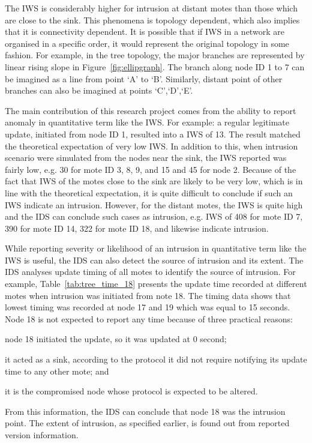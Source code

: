 \documentclass[conference,final]{IEEEtran}
\begin{document}
The IWS is considerably higher for intrusion at distant motes than those which are close to the sink.
This phenomena is topology dependent, which also implies  that it is connectivity dependent.
It is possible that if IWS in a network are organised in a specific order, it would represent the original topology in some fashion.
For example, in the tree topology, the major branches are represented by linear rising slope in Figure~\ref{fig:ellipgraph}.
The branch along node ID 1 to 7 can be imagined as a line from point `A' to `B'. Similarly, distant point of other branches can also be imagined at points `C',`D',`E'.


The main contribution of this research project comes from the ability to report anomaly in quantitative term like the IWS.
For example:  a regular legitimate update, initiated from node ID 1, resulted into a IWS of 13.
The result matched the theoretical expectation of very low IWS.
In addition to this, when intrusion scenario were simulated from the nodes near the sink, the IWS reported was fairly low, e.g. 30 for mote ID 3, 8, 9, and 15
 and 45 for node 2. 
Because of the fact that IWS of the motes close to the sink are likely to be very low, which is in line with the theoretical expectation, it is quite difficult to conclude if such an IWS indicate an intrusion. 
However, for the distant motes, the IWS is quite high and the IDS can conclude such cases as intrusion, e.g. IWS of 408 for mote ID 7, 390 for mote ID 14, 322 for mote ID 18, 
and likewise indicate intrusion.


While reporting severity or likelihood of an intrusion in quantitative term like the IWS is useful, the IDS can also detect the source of intrusion and its extent. 
The IDS analyses update timing of all motes to identify the source of intrusion. 
For example, Table~\ref{tab:tree_time_18} presents the update time recorded at different motes when intrusion was initiated from note 18.
The timing data shows that lowest timing was recorded at node 17 and 19 which was equal to 15 seconds.
Node 18 is not expected to report any time because of three practical reasons: 
\begin{inparaenum}
\item node 18 initiated the update, so it was updated at $0$ second;
\item it acted as a sink, according to the protocol it did not require notifying its update time to any other mote; and 
\item it is the compromised node whose protocol is expected to be altered.
\end{inparaenum}
From this information, the IDS can conclude that node 18 was the intrusion point.
The extent of intrusion, as specified earlier, is found out from reported version information.
\end{document}
